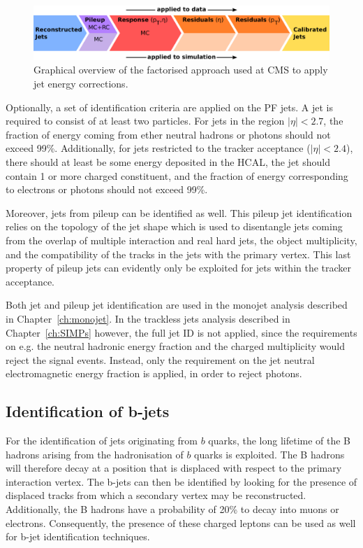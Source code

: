 \begin{figure}[ht]
  \centering
 \includegraphics[width=.85\textwidth]{JEC.pdf} 
 \caption{Graphical overview of the factorised approach used at \ac{CMS} to apply jet energy corrections.}
 \label{fig:JEC}
\end{figure}

Optionally, a set of identification criteria are applied on the \ac{PF} jets. A jet is required to consist of at least two particles. For jets in the region $|\eta| < 2.7$, the fraction of energy coming from ether neutral hadrons or photons should not exceed 99\%. Additionally, for jets restricted to the tracker acceptance ($|\eta| < 2.4$), there should at least be some energy deposited in the \ac{HCAL}, the jet should contain 1 or more charged constituent, and the fraction of energy corresponding to electrons or photons should not exceed 99\%. 

Moreover, jets from pileup can be identified as well. This pileup jet identification relies on the topology of the jet shape which is used to disentangle jets coming from the overlap of multiple interaction and real hard jets, the object multiplicity, and the compatibility of the tracks in the jets with the primary vertex. This last property of pileup jets can evidently only be exploited for jets within the tracker acceptance.

Both jet and pileup jet identification are used in the monojet analysis described in Chapter~\ref{ch:monojet}. In the trackless jets analysis described in Chapter~\ref{ch:SIMPs} however, the full jet ID is not applied, since the requirements on e.g. the neutral hadronic energy fraction and the charged multiplicity would reject the signal events. Instead, only the requirement on the jet neutral electromagnetic energy fraction is applied, in order to reject photons.

\subsection{Identification of b-jets}
\label{sec:btagging}

For the identification of jets originating from $b$ quarks, the long lifetime of the B hadrons arising from the hadronisation of $b$ quarks is exploited. The B hadrons will therefore decay at a position that is displaced with respect to the primary interaction vertex. The b-jets can then be identified by looking for the presence of displaced tracks from which a secondary vertex may be reconstructed. Additionally, the B hadrons have a probability of 20\% to decay into muons or electrons. Consequently, the presence of these charged leptons can be used as well for b-jet identification techniques.

